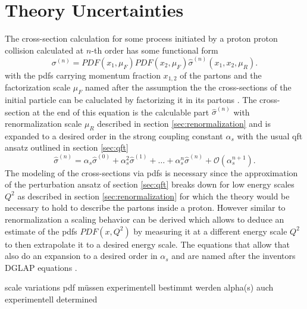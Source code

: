 \section{Theory Uncertainties}
The cross-section calculation for some process initiated by a proton proton collision calculated at $n$-th order has some functional form \citep{unc_recipe}
\begin{equation}
    \sigma^{(n)} = PDF(x_1, \mu_F)  PDF(x_2, \mu_F) \hat{\sigma}^{(n)}(x_1,x_2,\mu_R).
    \label{eq:xs_unc_1}
\end{equation}
with the \acfp{pdf} carrying momentum fraction $x_{1,2}$ of the partons and the factorization scale $\mu_F$ named after the assumption the the cross-sections of the initial particle can be caluclated by factorizing it in its partons \citep{halzen1984introductory}. The cross-section at the end of this equation is the calculable part $\hat{\sigma}^{(n)}$ with renormalization scale $\mu_R$ described in section \ref{sec:renormalization} and is expanded to a desired order in the strong coupling constant $\alpha_s$ with the usual \ac{qft} ansatz outlined in section \ref{sec:qft}
\begin{equation}
    \hat{\sigma}^{(n)} = \alpha_s \hat{\sigma}^{(0)} + \alpha_s^2 \hat{\sigma}^{(1)} + \ldots + \alpha_s^n \hat{\sigma}^{(n)} + \mathcal{O}(\alpha_s^{n+1}).
    \label{eq:xs_unc_2}
\end{equation}
The modeling of the cross-sections via \acp{pdf} is necessary since the approximation of the perturbation ansatz of section \ref{sec:qft} breaks down for low energy scales $Q^2$ as described in section \ref{sec:renormalization} for which the theory would be necessary to hold to describe the partons inside a proton. However similar to renormalization a scaling behavior can be derived which allows to deduce an estimate of the \acp{pdf} $PDF(x,Q^2)$ by measuring it at a different energy scale $Q^2$ to then extrapolate it to a desired energy scale. The equations that allow that also do an expansion to a desired order in $\alpha_s$ and are named after the inventors DGLAP equations \citep{halzen1984introductory}.


scale variations
pdf müssen experimentell bestimmt werden
alpha(s) auch experimentell determined 







